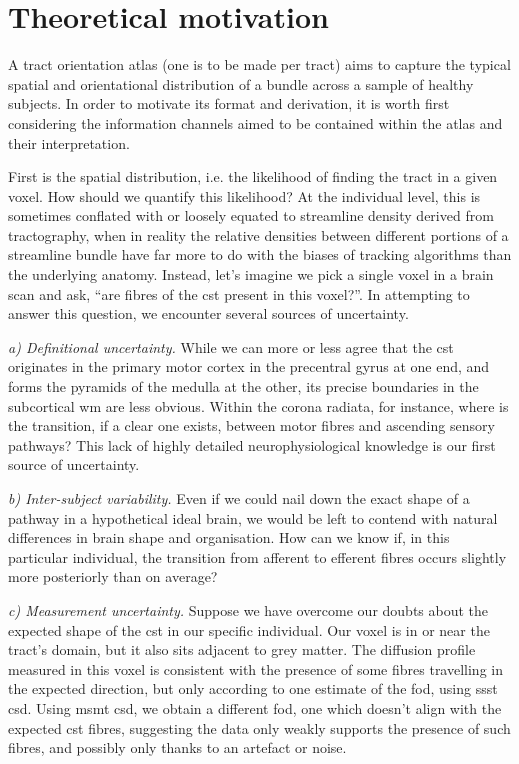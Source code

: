 \documentclass[12pt,phd,a4paper,twoside]{ucl_thesis}
\begin{document}
\section{Theoretical motivation}

A tract orientation atlas (one is to be made per tract) aims to capture the typical spatial and orientational distribution of a bundle across a sample of healthy subjects.
In order to motivate its format and derivation, it is worth first considering the information channels aimed to be contained within the atlas and their interpretation.

First is the spatial distribution, i.e. the likelihood of finding the tract in a given voxel.
How should we quantify this likelihood?
At the individual level, this is sometimes conflated with or loosely equated to streamline density derived from tractography, when in reality the relative densities between different portions of a streamline bundle have far more to do with the biases of tracking algorithms than the underlying anatomy.
Instead, let's imagine we pick a single voxel in a brain scan and ask, ``are fibres of the \gls{cst} present in this voxel?''.
In attempting to answer this question, we encounter several sources of uncertainty.

\textit{a) Definitional uncertainty.}
While we can more or less agree that the \gls{cst} originates in the primary motor cortex in the precentral gyrus at one end, and forms the pyramids of the medulla at the other, its precise boundaries in the subcortical \gls{wm} are less obvious.
Within the corona radiata, for instance, where is the transition, if a clear one exists, between motor fibres and ascending sensory pathways?
This lack of highly detailed neurophysiological knowledge is our first source of uncertainty.

\textit{b) Inter-subject variability.}
Even if we could nail down the exact shape of a pathway in a hypothetical ideal brain, we would be left to contend with natural differences in brain shape and organisation.
How can we know if, in this particular individual, the transition from afferent to efferent fibres occurs slightly more posteriorly than on average?

\textit{c) Measurement uncertainty.}
Suppose we have overcome our doubts about the expected shape of the \gls{cst} in our specific individual.
Our voxel is in or near the tract's domain, but it also sits adjacent to grey matter.
The diffusion profile measured in this voxel is consistent with the presence of some fibres travelling in the expected direction, but only according to one estimate of the \gls{fod}, using \gls{ssst} \gls{csd}.
Using \gls{msmt} \gls{csd}, we obtain a different \gls{fod}, one which doesn't align with the expected \gls{cst} fibres, suggesting the data only weakly supports the presence of such fibres, and possibly only thanks to an artefact or noise.
\end{document}
